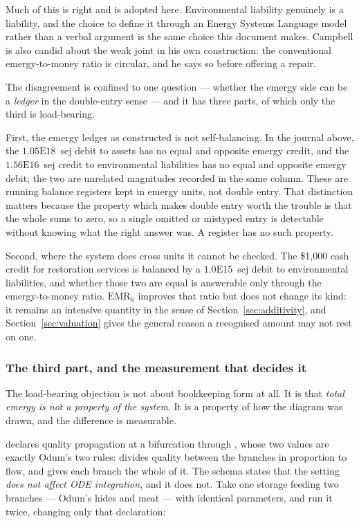 \documentclass[11pt,a4paper]{article}
\begin{document}
Much of this is right and is adopted here. Environmental liability genuinely is a liability, and the choice to define it through an Energy Systems Language model rather than a verbal argument is the same choice this document makes. Campbell is also candid about the weak joint in his own construction: the conventional emergy-to-money ratio is circular, and he says so before offering a repair.

The disagreement is confined to one question --- whether the emergy side can be a \emph{ledger} in the double-entry sense --- and it has three parts, of which only the third is load-bearing.

First, the emergy ledger as constructed is not self-balancing. In the journal above, the $1.05\mathrm{E}18$~sej debit to assets has no equal and opposite emergy credit, and the $1.56\mathrm{E}16$~sej credit to environmental liabilities has no equal and opposite emergy debit; the two are unrelated magnitudes recorded in the same column. These are running balance registers kept in emergy units, not double entry. That distinction matters because the property which makes double entry worth the trouble is that the whole sums to zero, so a single omitted or mistyped entry is detectable without knowing what the right answer was. A register has no such property.

Second, where the system does cross units it cannot be checked. The \$1{,}000 cash credit for restoration services is balanced by a $1.0\mathrm{E}15$~sej debit to environmental liabilities, and whether those two are equal is answerable only through the emergy-to-money ratio. $\mathrm{EMR_S}$ improves that ratio but does not change its kind: it remains an intensive quantity in the sense of Section~\ref{sec:additivity}, and Section~\ref{sec:valuation} gives the general reason a recognised amount may not rest on one.

\subsubsection*{The third part, and the measurement that decides it}

The load-bearing objection is not about bookkeeping form at all. It is that \emph{total emergy is not a property of the system}. It is a property of how the diagram was drawn, and the difference is measurable.

\gssk{} declares quality propagation at a bifurcation through , whose two values are exactly Odum's two rules:  divides quality between the branches in proportion to flow, and  gives each branch the whole of it. The schema states that the setting \emph{does not affect ODE integration}, and it does not. Take one storage feeding two branches --- Odum's hides and meat --- with identical parameters, and run it twice, changing only that declaration:
\end{document}
